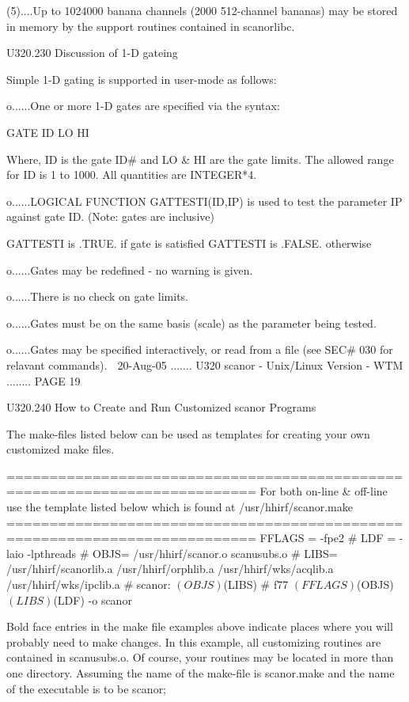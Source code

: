    (5)....Up  to  1024000  banana  channels  (2000 512-channel bananas) may be
          stored in memory by the support routines contained in scanorlibc.
 
 
   U320.230  Discussion of 1-D gateing
 
   Simple 1-D gating is supported in user-mode as follows:
 
   o......One or more 1-D gates are specified via the syntax:
 
          GATE ID LO HI
 
          Where, ID is the gate ID# and LO &  HI  are  the  gate  limits.  The
          allowed range for ID is 1 to 1000. All quantities are INTEGER*4.
 
   o......LOGICAL  FUNCTION  GATTESTI(ID,IP)  is used to test the parameter IP
          against gate ID. (Note: gates are inclusive)
 
          GATTESTI is .TRUE.  if gate is satisfied
          GATTESTI is .FALSE. otherwise
 
   o......Gates may be redefined - no warning is given.
 
   o......There is no check on gate limits.
 
   o......Gates must be on the same  basis  (scale)  as  the  parameter  being
          tested.
 
   o......Gates  may be specified interactively, or read from a file (see SEC#
          030 for relavant commands).
    
   20-Aug-05 ....... U320  scanor - Unix/Linux Version - WTM ........ PAGE  19
 
 
   U320.240  How to Create and Run Customized scanor Programs
 
   The make-files listed below can be used as templates for creating your  own
   customized make files.
 
   ===========================================================================
   For both on-line & off-line use the template listed below which is found at
   /usr/hhirf/scanor.make
   ===========================================================================
   FFLAGS = -fpe2
   #
   LDF = -laio -lpthreads
   #
   OBJS= /usr/hhirf/scanor.o
         scanusubs.o
   #
   LIBS= /usr/hhirf/scanorlib.a
         /usr/hhirf/orphlib.a
         /usr/hhirf/wks/acqlib.a
         /usr/hhirf/wks/ipclib.a
   #
   scanor: $(OBJS) $(LIBS)
   #
           f77 $(FFLAGS) $(OBJS) $(LIBS) $(LDF) -o scanor
 
   Bold  face  entries  in  the make file examples above indicate places where
   you will probably need to make changes. In this  example,  all  customizing
   routines  are  contained  in  scanusubs.o.  Of course, your routines may be
   located in more than one directory. Assuming the name of the  make-file  is
   scanor.make and the name of the executable is to be scanor;
 
